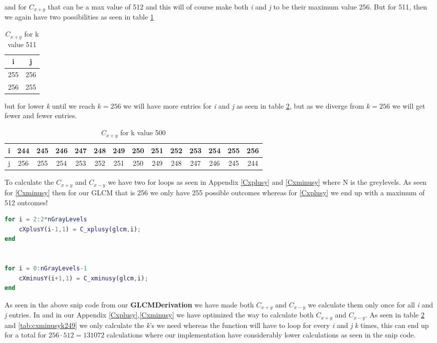 and for $C_{x+y}$ that can be a max value of 512 and this will of course make both \textit{i} and \textit{j} to be their maximum value 256. But for 511, then we again have two possibilities as seen in table \ref{tab:cxplusyk511}

\begin{table}[H]
  \centering
    \begin{tabular}{|c|c|}
    \hline
    i     & j \\
    \hline
    255   & 256 \\
    \hline
    256   & 255 \\
    \hline
    \end{tabular}%
  \caption{$C_{x+y}$ for k value 511}\label{tab:cxplusyk511}%
\end{table}%

but for lower \emph{k} until we reach $k=256$ we will have more entries for \textit{i} and \textit{j} as seen in table \ref{tab:cxplusyk500}, but as we diverge from $k=256$ we will get fewer and fewer entries.

\begin{table}[H]
  \centering
    \begin{tabular}{|c|c|c|c|c|c|c|c|c|c|c|c|c|c|}
    \hline
    i     & 244   & 245   & 246   & 247   & 248   & 249   & 250   & 251   & 252   & 253   & 254   & 255   & 256 \\
    \hline
    j     & 256   & 255   & 254   & 253   & 252   & 251   & 250   & 249   & 248   & 247   & 246   & 245   & 244 \\
    \hline
    \end{tabular}%
  \caption{$C_{x+y}$ for k value 500}\label{tab:cxplusyk500}%
\end{table}%

To calculate the $C_{x+y}$ and $C_{x-y}$ we have two for loops as seen in Appendix \ref{Cxplusy} and \ref{Cxminusy} where N is the greylevels. As seen for \ref{Cxminusy} then for our GLCM that is 256 we only have 255 possible outcomes whereas for \ref{Cxplusy} we end up with a maximum of 512 outcomes!

\begin{lstlisting}[language=Matlab]
for i = 2:2*nGrayLevels
    cXplusY(i-1,1) = C_xplusy(glcm,i);
end


for i = 0:nGrayLevels-1
    cXminusY(i+1,1) = C_xminusy(glcm,i);
end
\end{lstlisting}

As seen in the above snip code from our \textbf{GLCMDerivation} we have made both $C_{x+y}$ and $C_{x-y}$ we calculate them only once for all \textit{i} and \textit{j} entries. In \cite{MRfreeborough} and in our Appendix \ref{Cxplusy},\ref{Cxminusy} we have optimized the way to calculate both $C_{x+y}$ and $C_{x-y}$. As seen in table \ref{tab:cxplusyk500} and \ref{tab:cxminusyk249} we only calculate the \textit{k}'s we need whereas the function will have to loop for every \textit{i} and \textit{j} \textit{k} times, this can end up for a total for $256 \cdot 512 = 131072$ calculations where our implementation have considerably lower calculations as seen in the snip code.

